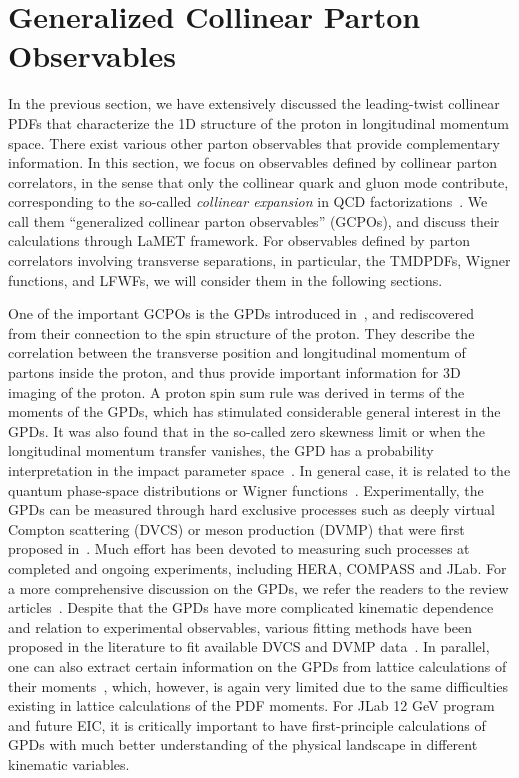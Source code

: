 \section{Generalized Collinear Parton Observables}
\label{sec:gpo}
In the previous section, we have extensively discussed the leading-twist collinear PDFs
that characterize the 1D structure of the proton in longitudinal momentum space.
There exist various other parton observables that provide complementary information.
In this section, we focus on observables defined by collinear parton correlators, in the sense
that only the collinear quark and gluon mode contribute, corresponding to the so-called
{\it collinear expansion} in QCD factorizations~\cite{Sterman:1994ce,Collins:2011zzd}.
We call them ``generalized collinear parton observables'' (GCPOs), and discuss their
calculations through LaMET framework. For observables defined by parton correlators
involving transverse separations, in particular, the TMDPDFs, Wigner functions,
and LFWFs, we will consider them in the following sections.

One of the important GCPOs is the GPDs introduced in~\cite{Mueller:1998fv}, and
rediscovered~\cite{Ji:1996ek} from their connection to the spin structure of the proton.
%
They describe the correlation between the transverse position and longitudinal momentum of partons inside the proton, and thus provide important information for 3D imaging of the proton. A proton spin sum rule was derived in terms of the moments of the GPDs, which has
stimulated considerable general interest in the GPDs. It was also found that
in the so-called zero skewness limit or when the longitudinal momentum transfer
vanishes, the GPD has a probability interpretation in the impact parameter space~\cite{Burkardt:2000za}.
%
In general case, it is related to the quantum phase-space distributions or Wigner functions~\cite{Ji:2003ak,Belitsky:2003nz}.
Experimentally, the GPDs can be measured through hard exclusive processes such as deeply virtual Compton scattering (DVCS) or meson production (DVMP) that were first proposed in~\cite{Ji:1996ek,Ji:1996nm}. Much effort has been devoted to measuring such processes at completed and ongoing experiments, including HERA, COMPASS and JLab. For a more comprehensive discussion on the GPDs, we refer the readers to the review articles~\cite{Ji:1998pc,Ji:2004gf,Diehl:2003ny,Belitsky:2005qn}.
%
Despite that the GPDs have more complicated kinematic dependence and relation to experimental observables,
various fitting methods have been proposed in the literature to fit available DVCS and DVMP data~\cite{Kumericki:2016ehc,Favart:2015umi}. In parallel, one can also extract certain information on the GPDs from lattice calculations of their moments~\cite{Hagler:2007xi,Gockeler:2003jfa,Alexandrou:2019ali}, which, however, is again very limited due to the same difficulties existing in lattice calculations of the PDF moments. For JLab 12 GeV program and future EIC, it
is critically important to have first-principle calculations of GPDs with much better understanding
of the physical landscape in different kinematic variables.


